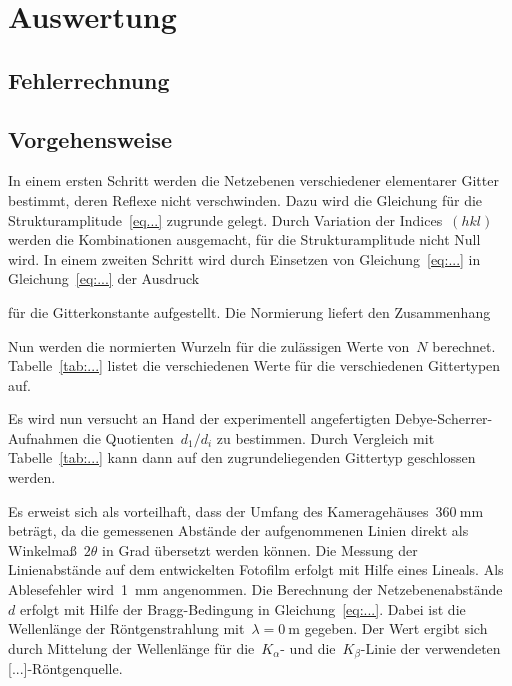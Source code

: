 ﻿\section{Auswertung}
\label{sec:auswertung}

\subsection{Fehlerrechnung}



\subsection{Vorgehensweise}

In einem ersten Schritt werden die Netzebenen verschiedener elementarer Gitter
bestimmt, deren Reflexe nicht verschwinden. Dazu wird die Gleichung für die
Strukturamplitude~\eqref{eq...} zugrunde gelegt. Durch Variation der
Indices~$(hkl)$ werden die Kombinationen ausgemacht, für die Strukturamplitude
nicht Null wird. In einem zweiten Schritt wird durch Einsetzen von
Gleichung~\eqref{eq:...} in Gleichung~\eqref{eq:...} der Ausdruck



für die Gitterkonstante aufgestellt. Die Normierung liefert den Zusammenhang



Nun werden die normierten Wurzeln für die zulässigen Werte von~$N$ berechnet.
Tabelle~\ref{tab:...} listet die verschiedenen Werte für die verschiedenen
Gittertypen auf.



Es wird nun versucht an Hand der experimentell angefertigten
Debye-Scherrer-Aufnahmen die Quotienten~$d_1/d_i$ zu bestimmen. Durch Vergleich
mit Tabelle~\ref{tab:...} kann dann auf den zugrundeliegenden Gittertyp
geschlossen werden.

Es erweist sich als vorteilhaft, dass der Umfang des
Kameragehäuses~$\SI{360}{\milli\metre}$ beträgt, da die gemessenen Abstände der
aufgenommenen Linien direkt als Winkelmaß~$2\theta$ in Grad übersetzt werden
können. Die Messung der Linienabstände auf dem entwickelten Fotofilm erfolgt mit
Hilfe eines Lineals. Als Ablesefehler wird~\SI{1}{\milli\metre} angenommen. Die
Berechnung der Netzebenenabstände~$d$ erfolgt mit Hilfe der Bragg-Bedingung in
Gleichung~\eqref{eq:...}. Dabei ist die Wellenlänge der Röntgenstrahlung
mit~$\lambda=\SI{0}{\metre}$ gegeben. Der Wert ergibt sich durch Mittelung der
Wellenlänge für die~$K_{\alpha}$- und die~$K_{\beta}$-Linie der verwendeten
[...]-Röntgenquelle.

